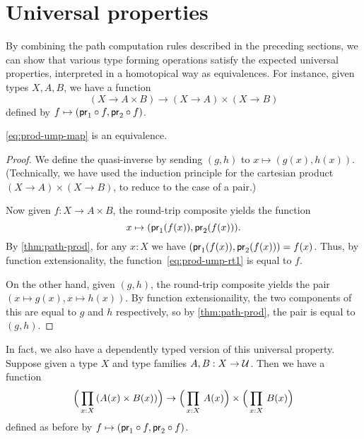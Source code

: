 \section{Universal properties}
\label{sec:universal-properties}

%
By combining the path computation rules described in the preceding sections, we can show that various type forming operations satisfy the expected universal properties, interpreted in a homotopical way as equivalences.
For instance, given types $X,A,B$, we have a function
%
%
\begin{equation}\label{eq:prod-ump-map}
  (X\to A\times B) \to (X\to A)\times (X\to B)
\end{equation}
defined by $f \mapsto (\mathsf{pr}_{1} \circ f, \mathsf{pr}_{2}\circ f)$.

\begin{thm}\label{thm:prod-ump}
  \eqref{eq:prod-ump-map} is an equivalence.
\end{thm}
\begin{proof}
  We define the quasi-inverse by sending $(g,h)$ to $x\mapsto (g(x),h(x))$.
  (Technically, we have used the induction principle for the cartesian product $(X\to A)\times (X\to B)$, to reduce to the case of a pair.)

  Now given $f:X\to A\times B$, the round-trip composite yields the function
  \begin{equation}
    x\mapsto (\proj1(f(x)),\proj2(f(x))).\label{eq:prod-ump-rt1}
  \end{equation}
  By \autoref{thm:path-prod}, for any $x:X$ we have $(\mathsf{pr}_{1}(f(x)),\mathsf{pr}_{2}(f(x))) = f(x)$.
  Thus, by function extensionality, the function~\eqref{eq:prod-ump-rt1} is equal to $f$.

  On the other hand, given $(g,h)$, the round-trip composite yields the pair $(x\mapsto g(x),x\mapsto h(x))$.
  By function extensionaility, the two components of this are equal to $g$ and $h$ respectively, so by \autoref{thm:path-prod}, the pair is equal to $(g,h)$.
\end{proof}

In fact, we also have a dependently typed version of this universal property.
Suppose given a type $X$ and type families $A,B:X\to \mathcal{U}$.
Then we have a function
\begin{equation}\label{eq:prod-umpd-map}
  \Big(\prd{x:X} (A(x)\times B(x))\Big) \to \Big(\prd{x:X} A(x)\Big) \times \Big(\prd{x:X} B(x)\Big)
\end{equation}
defined as before by $f \mapsto (\mathsf{pr}_{1} \circ f, \mathsf{pr}_{2}\circ f)$.

